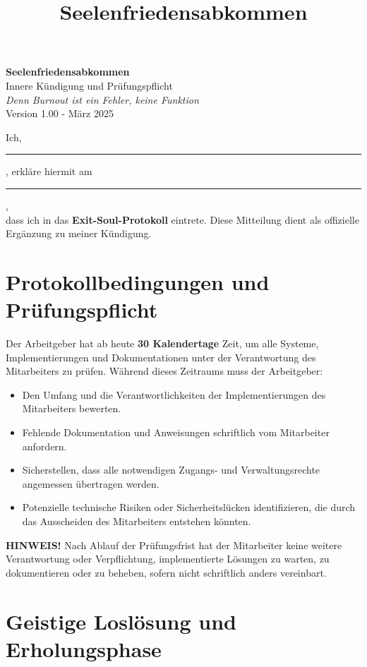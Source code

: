 \documentclass[a4paper,11pt]{article}
\title{Seelenfriedensabkommen}
\date{}
\begin{document}
\pagestyle{empty}

\begin{center}
    {\LARGE \textbf{Seelenfriedensabkommen}}\\[1em]
    {\large Innere Kündigung und Prüfungspflicht}\\[0.5em]
    \textit{Denn Burnout ist ein Fehler, keine Funktion}\\[0.5em]
    {\small Version 1.00 - März 2025}
\end{center}

\vspace{2em}

Ich, \rule{7cm}{0.2pt}, erkläre hiermit am \rule{4cm}{0.2pt},\\
dass ich in das \textbf{Exit-Soul-Protokoll} eintrete. Diese Mitteilung dient als offizielle Ergänzung zu meiner Kündigung.

\section*{Protokollbedingungen und Prüfungspflicht}

Der Arbeitgeber hat ab heute \textbf{30 Kalendertage} Zeit, um alle Systeme, Implementierungen und Dokumentationen unter der Verantwortung des Mitarbeiters zu prüfen. Während dieses Zeitraums muss der Arbeitgeber:

\begin{itemize}
    \item Den Umfang und die Verantwortlichkeiten der Implementierungen des Mitarbeiters bewerten.
    \item Fehlende Dokumentation und Anweisungen schriftlich vom Mitarbeiter anfordern.
    \item Sicherstellen, dass alle notwendigen Zugangs- und Verwaltungsrechte angemessen übertragen werden.
    \item Potenzielle technische Risiken oder Sicherheitslücken identifizieren, die durch das Ausscheiden des Mitarbeiters entstehen könnten.
\end{itemize}

\textbf{HINWEIS!} Nach Ablauf der Prüfungsfrist hat der Mitarbeiter keine weitere Verantwortung oder Verpflichtung, implementierte Lösungen zu warten, zu dokumentieren oder zu beheben, sofern nicht schriftlich anders vereinbart.

\section*{Geistige Loslösung und Erholungsphase}
\end{document}
